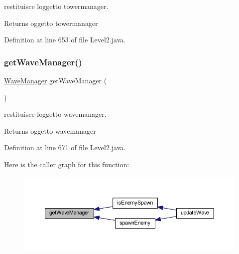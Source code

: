 restituisce l\textquotesingle{}oggetto towermanager. 

\begin{DoxyReturn}{Returns}
oggetto towermanager 
\end{DoxyReturn}


Definition at line 653 of file Level2.\+java.

\mbox{\label{classscenes_1_1_level2_a6b0fc6fbe769f38b9418fbaa51214735}} 
\subsubsection{\texorpdfstring{get\+Wave\+Manager()}{getWaveManager()}}
{\footnotesize\ttfamily \hyperlink{classmanagers_1_1_wave_manager}{Wave\+Manager} get\+Wave\+Manager (\begin{DoxyParamCaption}{ }\end{DoxyParamCaption})}



restituisce l\textquotesingle{}oggetto wavemanager. 

\begin{DoxyReturn}{Returns}
oggetto wavemanager 
\end{DoxyReturn}


Definition at line 671 of file Level2.\+java.

Here is the caller graph for this function\+:\nopagebreak
\begin{figure}[H]
\begin{center}
\leavevmode
\includegraphics[width=350pt]{classscenes_1_1_level2_a6b0fc6fbe769f38b9418fbaa51214735_icgraph}
\end{center}
\end{figure}
\mbox{\label{classscenes_1_1_level2_aded9c531b53772fd90d09a8b6bf0132e}} 
